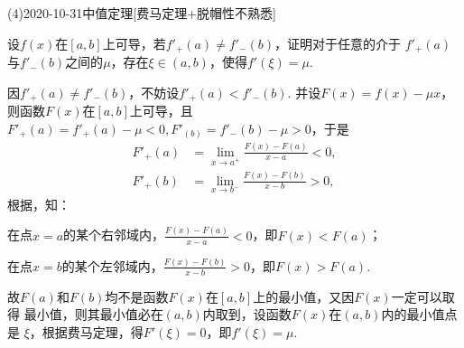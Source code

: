 \documentclass{ctexart}
\begin{document}
\begin{mathques}(4){2020-10-31}{中值定理}[费马定理+脱帽性不熟悉]
\begin{ques}
  设$f(x)$在$[a, b]$上可导，若$f'_+(a) \neq f'_-(b)$，证明对于任意的介于
  $f'_+(a)$与$f'_-(b)$之间的$\mu$，存在$\xi \in (a, b)$，使得$f'(\xi) = \mu$.
\end{ques}
\begin{solu}
  \mathproof 因$f'_+(a) \neq f'_-(b)$，不妨设$f'_+(a) < f'_-(b)$. 并设$F(x) =
  f(x) - \mu x$，则函数$F(x)$在$[a, b]$上可导，且$F'_+(a) = f'_+(a) - \mu < 0,
  F'_(b) = f'_-(b) - \mu > 0$，于是
  \begin{align*}
    F'_+(a) &= \lim_{x \to a^+} \frac{F(x) - F(a)}{x - a} < 0,\\
    F'_+(b) &= \lim_{x \to b^-} \frac{F(x) - F(b)}{x - b} > 0,
  \end{align*}
  根据，知：
  {\ccwd\par
    在点$x=a$的某个右邻域内，$\frac{F(x) - F(a)}{x - a} < 0$，即$F(x) < F(a)$；
    \vspace{1em}

    在点$x=b$的某个左邻域内，$\frac{F(x) - F(b)}{x - b} > 0$，即$F(x) > F(a)$.
  }

  故$F(a)$和$F(b)$均不是函数$F(x)$在$[a, b]$上的最小值，又因$F(x)$一定可以取得
  最小值，则其最小值必在$(a, b)$内取到，设函数$F(x)$在$(a, b)$内的最小值点是
  $\xi$，根据费马定理，得$F'(\xi) = 0$，即$f'(\xi) = \mu$.
\end{solu}
\end{mathques}
\end{document}

